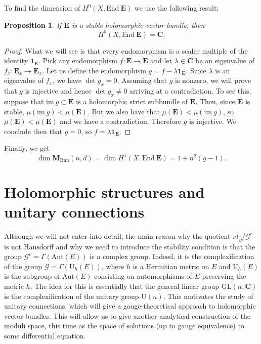 \documentclass[12pt,a4paper]{book}
\newtheorem{prop}[thm]{Proposition}
\theoremstyle{definition} \newtheorem{defn}[thm]{Definition}
\theoremstyle{definition} \newtheorem{ejemplo}[thm]{Example}
\theoremstyle{remark} \newtheorem{rem}[thm]{Remark}
\def\AA{\mathscr{A}}
\def\GG{\mathscr{G}}
\def\CC{\mathbf{C}}
\def\id{\mathbf{1}}
\def\im{\mathrm{im}\ }
\def\End{\mathrm{End}}
\def\Aut{\mathrm{Aut}}
\def\UU{\mathrm{U}}
\def\Bun{\mathbf{M}_{\mathrm{Bun}}}
\def\delbar{\bar{\partial}}
\newcommand{\ve}[1]{\mathbf{#1}}
\begin{document}
	   To find the dimension of $H^0(X,\End\ \ve{E})$ we use the following result:
	   \begin{prop}
	     If $\ve{E}$ is a stable holomorphic vector bundle, then
	     \begin{equation*}
	       H^0(X,\End\ \ve{E})=\CC.
	     \end{equation*}
	   \end{prop}
	   \begin{proof}
	     What we will see is that every endomorphism is a scalar multiple of the identity $\id_{\ve{E}}$. Pick any endomorphism $f:\ve{E}\rightarrow \ve{E}$ and let $\lambda \in \CC$ be an eigenvalue of $f_x:\ve{E}_x \rightarrow \ve{E}_x$. Let us define the endomorphism $g=f-\lambda \id_{\ve{E}}$. Since $\lambda$ is an eigenvalue of $f_x$, we have $\det g_x=0$. 
	     Assuming that $g$ is nonzero, we will prove that $g$ is injective and hence $\det g_x\neq 0$ arriving at a contradiction.
	     To see this, suppose that $\im g \subset \ve{E}$ is a holomorphic strict subbundle of $\ve{E}$. Then, since $\ve{E}$ is stable, $\mu(\im g) < \mu(\ve{E})$. But we also have that $\mu(\ve{E})<\mu(\im g)$, so $\mu(\ve{E})<\mu(\ve{E})$ and we have a contradiction. Therefore $g$ is injective.	     
	     We conclude then that $g=0$, so $f=\lambda\id_{\ve{E}}$.
	   \end{proof}

	   Finally, we get
	   \begin{equation*}
	     \dim \Bun(n,d)=\dim H^1(X,\End\ \ve{E})= 1+n^2(g-1).
	   \end{equation*}


	   

	   \section{Holomorphic structures and unitary connections}
	   Although we will not enter into detail, the main reason why the quotient $\AA_{\delbar}/\GG^c$ is not Hausdorff and why we need to introduce the stability condition is that the group $\GG^c=\Gamma(\Aut(E))$ is a complex group. Indeed, it is the complexification of the group $\GG=\Gamma(\UU_h(E))$, where $h$ is a Hermitian metric on $E$ and $\UU_h(E)$ is the subgroup of $\Aut(E)$ consisting on automorphisms of $E$ preserving the metric $h$. The idea for this is essentially that the general linear group $\mathrm{GL}(n,\CC)$ is the complexification of the unitary group $\mathrm{U}(n)$. This motivates the study of unitary connections,
which will give a gauge-theoretical approach to holomorphic vector bundles. This will allow us to give another analytical construction of the moduli space, this time as the space of solutions (up to gauge equivalence) to some differential equation.
\end{document}
